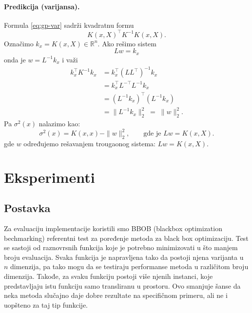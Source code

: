 ﻿\documentclass[11pt,a4paper]{article}
\begin{document}
\paragraph{Predikcija (varijansa).}
Formula \eqref{eq:gp-var} sadrži kvadratnu formu
\[
  K(x,X)^\top K^{-1} K(x,X).
\]
Označimo $k_x = K(x,X)\in\mathbb{R}^{n}$.
Ako rešimo sistem
\begin{equation*}
  L w = k_x
\end{equation*}
onda je $w = L^{-1}k_x$ i važi
\begin{align*}
  k_x^\top K^{-1} k_x
   & = k_x^\top (LL^\top)^{-1} k_x        \\
   & = k_x^\top L^{-\top}L^{-1}k_x        \\
   & = (L^{-1}k_x)^\top (L^{-1}k_x)       \\
   & = \|L^{-1}k_x\|_2^2 \;=\; \|w\|_2^2.
\end{align*}
Pa $\sigma^2(x)$ nalazimo kao:
\begin{equation}
  \sigma^2(x) = K(x,x) - \|w\|_2^2, \qquad \text{gde je } Lw=K(x,X). \nonumber
\end{equation}
gde $w$ određujemo rešavanjem trougaonog sistema: $Lw=K(x,X)$.
\section{Eksperimenti}

\subsection{Postavka}

Za evaluaciju implementacije koristili smo BBOB (blackbox optimization bechmarking) referentni test za poređenje metoda za black box optimizaciju. Test se sastoji od raznovrsnih funkcija koje je potrebno minimizovati u što manjem broju evaluacija. Svaka funkcija je napravljena tako da postoji njena varijanta u $n$ dimenzija, pa tako mogu da se testiraju performanse metoda u različitom broju dimenzija. Takođe, za svaku funkciju postoji više njenih instanci, koje predstavljaju istu funkciju samo transliranu u prostoru. Ovo smanjuje šanse da neka metoda slučajno daje dobre rezultate na specifičnom primeru, ali ne i uopšteno za taj tip funkcije.
\end{document}

